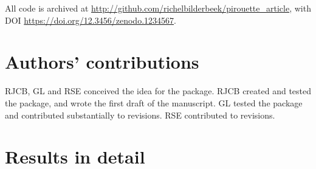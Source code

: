 \documentclass{article}
\begin{document}
All code is archived at \url{http://github.com/richelbilderbeek/pirouette_article},
with DOI \url{https://doi.org/12.3456/zenodo.1234567}.

\section{Authors' contributions}

RJCB, GL and RSE conceived the idea for the package. 
RJCB created and tested the package, and wrote the first draft of the manuscript.
GL tested the package and contributed substantially to revisions.
RSE contributed to revisions.




\appendix

\section{Results in detail}


\end{document}
